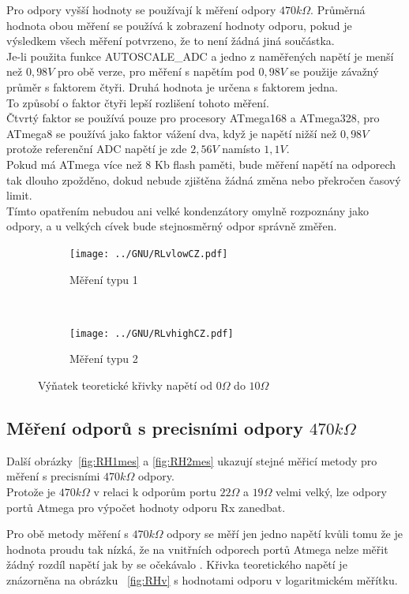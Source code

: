 Pro  odpory vyšší hodnoty se používají k měření odpory \(470k\Omega\).
Průměrná hodnota obou měření se používá k zobrazení hodnoty odporu, pokud je výsledkem všech měření potvrzeno, že to není žádná jiná součástka.\\
Je-li použita funkce AUTOSCALE\_ADC a jedno z naměřených napětí je menší než \(0,98V\) pro obě verze, pro měření s napětím pod \(0,98V\) se použije závažný průměr s faktorem čtyři. Druhá hodnota je určena s faktorem jedna.\\
To způsobí o faktor čtyři lepší rozlišení tohoto měření.\\
Čtvrtý faktor se používá pouze pro procesory ATmega168 a ATmega328, pro ATmega8 se používá jako faktor vážení dva, když je napětí nižší než \(0,98V\) protože referenční ADC napětí je zde \(2,56V\) namísto \(1,1V\).\\
Pokud má ATmega více než 8 Kb flash paměti, bude měření napětí na odporech tak dlouho zpožděno,
dokud nebude zjištěna žádná změna nebo překročen časový limit.\\
Tímto opatřením nebudou ani velké kondenzátory omylně rozpoznány jako odpory, a u velkých cívek bude stejnosměrný odpor správně změřen.

\begin{figure}[H]
  \begin{subfigure}[b]{9cm}
    \centering
    \texttt{[image: ../GNU/RLvlowCZ.pdf]}
    \caption{Měření typu 1}
    \label{fig:RLvlow}
  \end{subfigure}
  ~
  \begin{subfigure}[b]{9cm}
    \centering
    \texttt{[image: ../GNU/RLvhighCZ.pdf]}
    \caption{Měření typu 2}
    \label{fig:RLvhigh}
  \end{subfigure}
  \caption{Výňatek teoretické křivky napětí od \(0\Omega\) do \(10\Omega\)}
\end{figure}


\subsection{Měření odporů s precisními odpory \(470k\Omega\)}
Další obrázky~\ref{fig:RH1mes} a \ref{fig:RH2mes}  ukazují stejné měřicí metody pro měření s precisními \(470k\Omega\) odpory.\\
Protože je \(470k\Omega\) v relaci k odporům portu \(22\Omega\) a \(19\Omega\) velmi velký,
lze odpory portů Atmega  pro výpočet hodnoty odporu Rx zanedbat.

Pro obě metody měření s \(470k\Omega\) odpory se měří jen jedno napětí kvůli tomu že je hodnota proudu
tak nízká, že na vnitřních  odporech portů Atmega nelze měřit žádný rozdíl napětí jak by se očekávalo . Křivka teoretického napětí je znázorněna na obrázku ~\ref{fig:RHv} s hodnotami odporu v logaritmickém měřítku.

